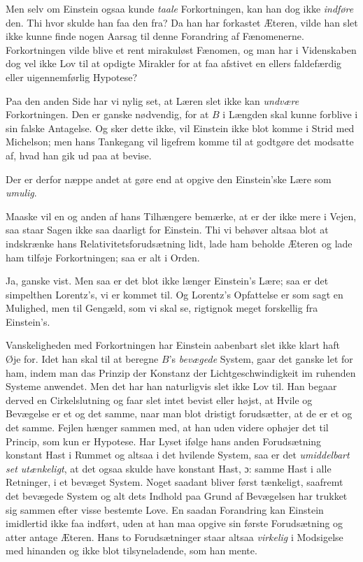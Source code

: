 \documentclass[12pt,a4paper]{article}
\newcommand{\opage}[1]{\marginnote{\footnotesize\textit{[#1]}}}
\begin{document}
Men selv om Einstein ogsaa kunde \emph{taale} Forkortningen, kan han dog ikke
\emph{indføre} den. Thi hvor skulde han faa den fra? Da han har forkastet
Æteren, vilde han slet ikke kunne finde nogen Aarsag til denne Forandring af
Fænomenerne. Forkortningen vilde blive et rent mirakuløst Fænomen, og man har i
Videnskaben dog vel ikke Lov til at opdigte Mirakler for at faa afstivet en
ellers faldefærdig eller uigennemførlig Hypotese?

Paa den anden Side har vi nylig set, at Læren slet ikke kan \emph{undvære}
Forkortningen. Den er ganske nødvendig, for at $B$ i Længden skal kunne
forblive i sin falske Antagelse. Og sker dette ikke, vil Einstein ikke blot
komme i Strid med Michelson; men hans Tankegang vil ligefrem komme til at
godtgøre det modsatte af, hvad han gik ud paa at bevise.

\opage{202} Der er derfor næppe andet at gøre end at opgive den Einstein'ske Lære som
\emph{umulig}.

Maaske vil en og anden af hans Tilhængere bemærke, at er der ikke mere i
Vejen, saa staar Sagen ikke saa daarligt for Einstein. Thi vi behøver altsaa
blot at indskrænke hans Relativitetsforudsætning lidt, lade ham beholde Æteren
og lade ham tilføje Forkortningen; saa er alt i Orden.

Ja, ganske vist. Men saa er det blot ikke længer Einstein's Lære; saa er det
simpelthen Lorentz's, vi er kommet til. Og Lorentz's Opfattelse er som sagt en
Mulighed, men til Gengæld, som vi skal se, rigtignok meget forskellig fra
Einstein's.

Vanskeligheden med Forkortningen har Einstein aabenbart slet ikke klart haft
Øje for. Idet han skal til at beregne $B$'s \emph{bevægede} System, gaar det
ganske let for ham, \guillemotleft indem man das Prinzip der Konstanz der
Lichtgeschwindigkeit im ruhenden Systeme anwendet.\guillemotright{} Men det har
han naturligvis slet ikke Lov til. Han begaar derved en Cirkelslutning og faar
slet intet bevist eller højst, at Hvile og Bevægelse er et og det samme, naar
man blot dristigt forudsætter, at de er et og det samme. Fejlen hænger sammen
med, at han uden videre \guillemotleft ophøjer\guillemotright{} det til
Princip, som kun er Hypotese. Har Lyset ifølge hans anden Forudsætning konstant
Hast i Rummet og altsaa i det hvilende System, saa er det \emph{umiddelbart set
utænkeligt}, at det ogsaa skulde have konstant Hast, ɔ: samme Hast i alle
Retninger, i et bevæget System. Noget saadant bliver først tænkeligt, saafremt
det bevægede System og alt dets Indhold paa Grund af Bevægelsen har trukket sig
sammen efter visse bestemte Love. En saadan Forandring kan Einstein imidlertid
ikke faa indført, uden at han maa opgive sin første Forudsætning og atter
antage Æteren. Hans to Forudsætninger staar altsaa \emph{virkelig} i
Modsigelse med hinanden og ikke blot tilsyneladende, som han mente.
\end{document}
